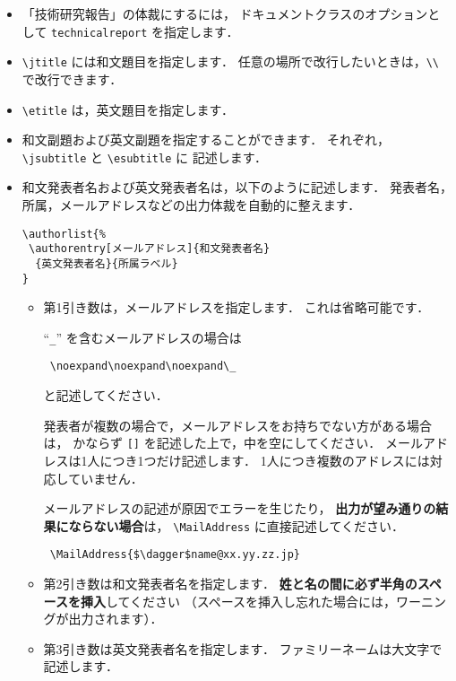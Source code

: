 \documentclass[technicalreport]{ieicej}
\begin{document}
\begin{itemize}
\item
「技術研究報告」の体裁にするには，
ドキュメントクラスのオプションとして
\texttt{technicalreport} を指定します．

\item
\verb/\jtitle/ には和文題目を指定します．
任意の場所で改行したいときは，\verb/\\/ で改行できます．

\item
\verb/\etitle/ は，英文題目を指定します．

\item
和文副題および英文副題を指定することができます．
それぞれ，\verb/\jsubtitle/ と \verb/\esubtitle/ に
記述します．

\item
和文発表者名および英文発表者名は，以下のように記述します．
発表者名，所属，メールアドレスなどの出力体裁を自動的に整えます．
\begin{verbatim}
\authorlist{%
 \authorentry[メールアドレス]{和文発表者名}
  {英文発表者名}{所属ラベル}
}
\end{verbatim}

\begin{itemize}
\item
第1引き数は，メールアドレスを指定します．
これは省略可能です．

``\texttt{\_}'' を含むメールアドレスの場合は
\begin{verbatim}
 \noexpand\noexpand\noexpand\_
\end{verbatim}
と記述してください．

発表者が複数の場合で，メールアドレスをお持ちでない方がある場合は，
かならず \texttt{[]} を記述した上で，中を空にしてください．
メールアドレスは1人につき1つだけ記述します．
1人につき複数のアドレスには対応していません．

メールアドレスの記述が原因でエラーを生じたり，
{\bfseries 出力が望み通りの結果にならない場合}は，
\verb/\MailAddress/ に直接記述してください．
\begin{verbatim}
 \MailAddress{$\dagger$name@xx.yy.zz.jp}
\end{verbatim}

\item
第2引き数は和文発表者名を指定します．
{\bfseries 姓と名の間に必ず半角のスペースを挿入}してください
（スペースを挿入し忘れた場合には，ワーニングが出力されます）．

\item
第3引き数は英文発表者名を指定します．
ファミリーネームは大文字で記述します．


\end{itemize}
\end{itemize}
\end{document}
